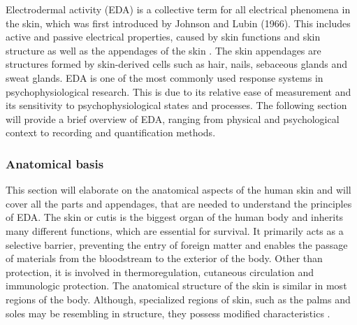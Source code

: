 
Electrodermal activity (EDA) is a collective term for all electrical phenomena in the skin, which was first introduced by Johnson and Lubin (1966). This includes active and passive electrical properties, caused by skin functions and skin structure as well as the appendages of the skin \cite{boucsein2013electrodermal}.%
The skin appendages are structures formed by skin-derived cells such as hair, nails, sebaceous glands and sweat glands. EDA is one of the most commonly used response systems in psychophysiological research. This is due to its relative ease of measurement and its sensitivity to psychophysiological states and processes. The following section will provide a brief overview of EDA, ranging from physical and psychological context to recording and quantification methods.

\subsubsection{Anatomical basis} 
This section will elaborate on the anatomical aspects of the human skin and will cover all the parts and appendages, that are needed to understand the principles of EDA. The skin or cutis is the biggest organ of the human body and inherits many different functions, which are essential for survival. It primarily acts as a selective barrier, preventing the entry of foreign matter and enables the passage of materials from the bloodstream to the exterior of the body. Other than protection, it is involved in thermoregulation, cutaneous circulation and immunologic protection.  
The anatomical structure of the skin is similar in most regions of the body. Although, specialized regions of skin, such as the palms and soles may be resembling in structure, they possess modified characteristics \cite{bologniadermatology}.%

